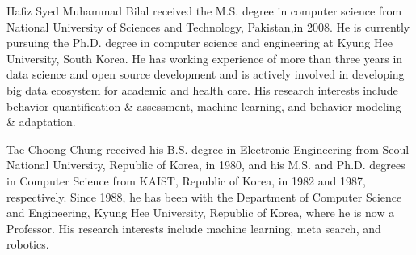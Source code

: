 \documentclass{ieeeaccess}
\begin{document}
\begin{IEEEbiography}{Hafiz Syed Muhammad Bilal}  received the M.S. degree in computer science from National University of Sciences and Technology, Pakistan,in 2008. He is currently pursuing the Ph.D. degree in computer science and engineering at Kyung Hee University, South Korea. He has working experience of more than three years in data science and open source development and is actively involved in developing big data ecosystem for academic and health care. His research interests include behavior quantification \& assessment, machine learning, and behavior modeling \& adaptation.
\end{IEEEbiography}
\begin{IEEEbiography}{Tae-Choong Chung}  received his B.S. degree in Electronic Engineering from Seoul National University, Republic of Korea, in 1980, and his M.S. and Ph.D. degrees in Computer Science from KAIST, Republic of Korea, in 1982 and 1987, respectively. Since 1988, he has been with the Department of Computer Science and Engineering, Kyung Hee University, Republic of Korea, where he is now a Professor. His research interests include machine learning, meta search, and robotics.
\end{IEEEbiography}
\end{document}
